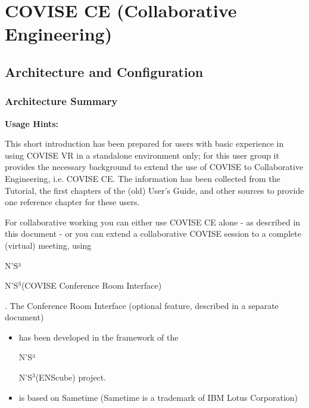 
\begin{htmlonly}




\end{htmlonly}


\startdocument
\chapter{COVISE CE (Collaborative Engineering)}
\label{CollabEngineering}

\section{Architecture and Configuration}
\label{Architecture}

\subsection{Architecture Summary}
\label{Architecture_Summary }


{\bf Usage Hints:}
\vspace{0.5cm}

This short introduction has been prepared for users with basic experience in using
COVISE VR in a standalone environment only; for this user group it provides the necessary
background to extend the use of COVISE to Collaborative Engineering, i.e. COVISE CE. The information 
has been collected from the Tutorial, the first chapters of the (old) User's Guide, and other sources
to provide one reference chapter for these users. 
   
\vspace{0.5cm}

For collaborative working you can either use COVISE CE alone - as described in this document - or
you can extend a collaborative COVISE session to a complete (virtual) meeting, using  
{\bf \begin{htmlonly}N'S³\end{htmlonly}\latexonly N'S$^3$\endlatexonly (COVISE Conference
Room Interface)}.
The Conference Room Interface (optional feature, described in a separate document)
\begin{itemize}
\item has been developed in the framework of the \begin{htmlonly}N'S³\end{htmlonly} 
\latexonly N'S$^3$\endlatexonly (ENScube) project.
\item is based on Sametime (Sametime is a trademark of IBM Lotus Corporation)
\end{itemize} 
\vspace{0.5cm}

